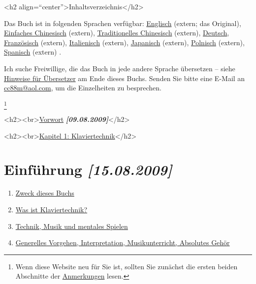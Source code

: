 
\label{Inhalt}

<h2 align=\enquote{center}>Inhaltsverzeichnis</h2>

Das Buch ist in folgenden Sprachen verfügbar:
 \hyperref[http://www.pianopractice.org]{Englisch} (extern; das Original),
 \hyperref[http://bbs.popiano.org/viewthread.php?tid=81448&amp;extra=page\%3D3]{Einfaches Chinesisch} (extern),
 \hyperref[http://www.pianogarden.tw]{Traditionelles Chinesisch} (extern),
 \hyperref[./index.html]{Deutsch},
 \hyperref[http://pagesperso-orange.fr/musico/documents/textes/pianopratique/tabledesmatieres_fr.htm]{Französisch} (extern),
 \hyperref[http://web.tiscali.it/pianobook]{Italienisch} (extern),
 \hyperref[http://pianofundamental.sakura.ne.jp]{Japanisch} (extern),
 \hyperref[http://pianoart.eu.interia.pl]{Polnisch} (extern),
 \hyperref[http://www.pianopractice.org/spanish.pdf]{Spanisch} (extern)
 .

Ich suche Freiwillige, die das Buch in jede andere Sprache übersetzen -- siehe \hyperref[HinUeber]{Hinweise für Übersetzer} am Ende dieses Buchs.
Senden Sie bitte eine E-Mail an \hyperref[mailto:cc88m@aol.com?subject=foppde:\%20Translation\%20request]{cc88m@aol.com}, um die Einzelheiten zu besprechen.

\footnote{Wenn diese Website neu für Sie ist, sollten Sie zunächst die ersten beiden Abschnitte der \hyperref[anmerkungen]{Anmerkungen} lesen.}


<h2><br>\hyperref[preface]{Vorwort} \textbf{\textit{[09.08.2009]}}</h2>

<h2><br>\hyperref[c1i1]{Kapitel 1: Klaviertechnik}</h2>

\section{Einführung \textbf{\textit{[15.08.2009]}}}

\begin{enumerate} 
 \item \hyperref[c1i1]{Zweck dieses Buchs}
 \item \hyperref[c1i2]{Was ist Klaviertechnik?}
 \item \hyperref[c1i3]{Technik, Musik und mentales Spielen}
 \item \hyperref[c1i4]{Generelles Vorgehen, Interpretation, Musikunterricht, Absolutes Gehör}
\end{enumerate}

